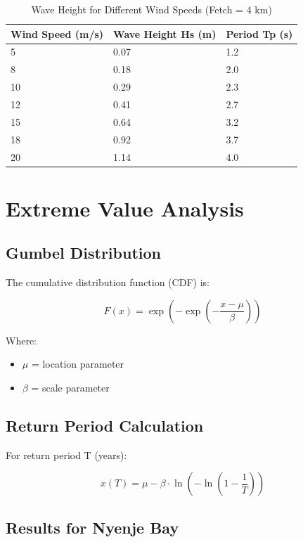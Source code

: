 \documentclass[12pt]{article}
\begin{document}
\begin{table}[h]
\centering
\begin{tabular}{|l|l|l|}
\hline
\textbf{Wind Speed (m/s)} & \textbf{Wave Height Hs (m)} & \textbf{Period Tp (s)} \\
\hline
5 & 0.07 & 1.2 \\
8 & 0.18 & 2.0 \\
10 & 0.29 & 2.3 \\
12 & 0.41 & 2.7 \\
15 & 0.64 & 3.2 \\
18 & 0.92 & 3.7 \\
20 & 1.14 & 4.0 \\
\hline
\end{tabular}
\caption{Wave Height for Different Wind Speeds (Fetch = 4 km)}
\end{table}

\newpage

\section{Extreme Value Analysis}

\subsection{Gumbel Distribution}

The cumulative distribution function (CDF) is:

\begin{equation}
F(x) = \exp\left(-\exp\left(-\frac{x - \mu}{\beta}\right)\right)
\end{equation}

Where:
\begin{itemize}
    \item $\mu$ = location parameter
    \item $\beta$ = scale parameter
\end{itemize}

\subsection{Return Period Calculation}

For return period T (years):

\begin{equation}
x(T) = \mu - \beta \cdot \ln\left(-\ln\left(1 - \frac{1}{T}\right)\right)
\end{equation}

\subsection{Results for Nyenje Bay}
\end{document}
